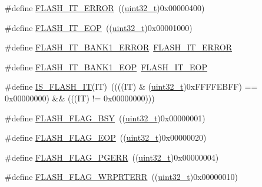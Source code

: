 \begin{DoxyCompactItemize}
\item 
\#define \hyperlink{group___f_l_a_s_h___interrupts_ga61c74493d4c1f36ddaf563719d446a7d}{F\+L\+A\+S\+H\+\_\+\+I\+T\+\_\+\+E\+R\+R\+OR}~((\hyperlink{_p_e___types_8h_a33594304e786b158f3fb30289278f5af}{uint32\+\_\+t})0x00000400)
\item 
\#define \hyperlink{group___f_l_a_s_h___interrupts_gaea20e80e1806d58a7544cfe8659e7f11}{F\+L\+A\+S\+H\+\_\+\+I\+T\+\_\+\+E\+OP}~((\hyperlink{_p_e___types_8h_a33594304e786b158f3fb30289278f5af}{uint32\+\_\+t})0x00001000)
\item 
\#define \hyperlink{group___f_l_a_s_h___interrupts_ga808627239be1bf9c2d8bfed36ec4db19}{F\+L\+A\+S\+H\+\_\+\+I\+T\+\_\+\+B\+A\+N\+K1\+\_\+\+E\+R\+R\+OR}~\hyperlink{group___f_l_a_s_h___interrupts_ga61c74493d4c1f36ddaf563719d446a7d}{F\+L\+A\+S\+H\+\_\+\+I\+T\+\_\+\+E\+R\+R\+OR}
\item 
\#define \hyperlink{group___f_l_a_s_h___interrupts_gac8825e2ce2c0e6ca63a40a347bd351a9}{F\+L\+A\+S\+H\+\_\+\+I\+T\+\_\+\+B\+A\+N\+K1\+\_\+\+E\+OP}~\hyperlink{group___f_l_a_s_h___interrupts_gaea20e80e1806d58a7544cfe8659e7f11}{F\+L\+A\+S\+H\+\_\+\+I\+T\+\_\+\+E\+OP}
\item 
\#define \hyperlink{group___f_l_a_s_h___interrupts_ga46ee77d0be1f3e0a14ded0651163ae11}{I\+S\+\_\+\+F\+L\+A\+S\+H\+\_\+\+IT}(IT)~((((IT) \& (\hyperlink{_p_e___types_8h_a33594304e786b158f3fb30289278f5af}{uint32\+\_\+t})0x\+F\+F\+F\+F\+E\+B\+F\+F) == 0x00000000) \&\& (((\+I\+T) != 0x00000000)))
\item 
\#define \hyperlink{group___f_l_a_s_h___flags_gad3bc368f954ad7744deda3315da2fff7}{F\+L\+A\+S\+H\+\_\+\+F\+L\+A\+G\+\_\+\+B\+SY}~((\hyperlink{_p_e___types_8h_a33594304e786b158f3fb30289278f5af}{uint32\+\_\+t})0x00000001)
\item 
\#define \hyperlink{group___f_l_a_s_h___flags_gaf043ba4d8f837350bfc7754a99fae5a9}{F\+L\+A\+S\+H\+\_\+\+F\+L\+A\+G\+\_\+\+E\+OP}~((\hyperlink{_p_e___types_8h_a33594304e786b158f3fb30289278f5af}{uint32\+\_\+t})0x00000020)
\item 
\#define \hyperlink{group___f_l_a_s_h___flags_gae2ef62dee0a5ca01e6226746039b6f20}{F\+L\+A\+S\+H\+\_\+\+F\+L\+A\+G\+\_\+\+P\+G\+E\+RR}~((\hyperlink{_p_e___types_8h_a33594304e786b158f3fb30289278f5af}{uint32\+\_\+t})0x00000004)
\item 
\#define \hyperlink{group___f_l_a_s_h___flags_ga5c59a7f07507cac38091275964d3d35d}{F\+L\+A\+S\+H\+\_\+\+F\+L\+A\+G\+\_\+\+W\+R\+P\+R\+T\+E\+RR}~((\hyperlink{_p_e___types_8h_a33594304e786b158f3fb30289278f5af}{uint32\+\_\+t})0x00000010)
\item 

\end{DoxyCompactItemize}

